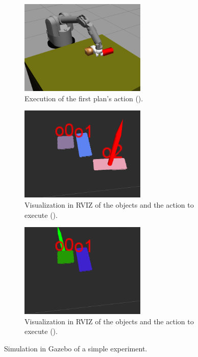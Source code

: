 \begin{figure}
\begin{subfigure}[h]{0.45\textwidth}
\centering
\includegraphics[width=6cm]{Img/simulation/pushing.png}
\caption{Execution of the first plan's action ().}\label{fig:sim_push}
\end{subfigure}
\begin{subfigure}[h]{0.45\textwidth}
\centering
\includegraphics[width=6cm]{Img/simulation/action2.png}
\caption{Visualization in RVIZ of the objects and the action to execute ().}\label{fig:action2}
\end{subfigure}
\begin{subfigure}[h]{0.45\textwidth}
\centering
\includegraphics[width=6cm]{Img/simulation/action3.png}
\caption{Visualization in RVIZ of the objects and the action to execute ().}\label{fig:action3}
\end{subfigure}
\caption{Simulation in Gazebo of a simple experiment.}\label{fig:simulation}
\end{figure}